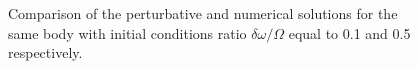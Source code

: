 \documentclass[a4paper]{article}
\begin{document}
	\begin{figure}[ht]
	  	\caption{Comparison of the perturbative and numerical solutions for the same body with initial conditions ratio $\delta \omega/\Omega$ equal to 0.1  and 0.5 respectively.}\label{Numerical_vs_Perturbative_plot}
	\end{figure}
	
\end{document}
